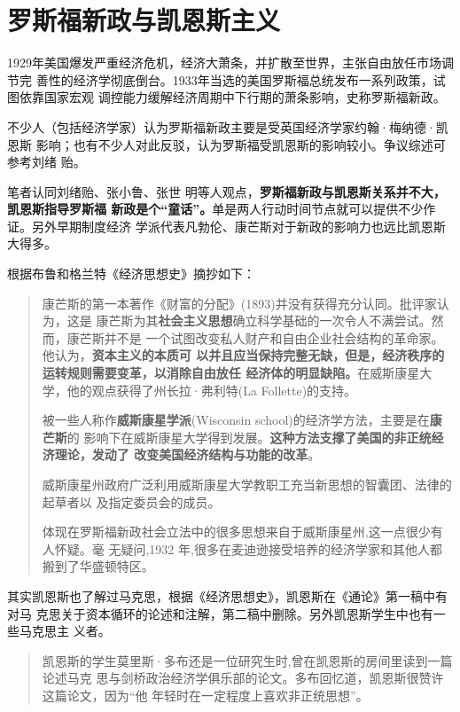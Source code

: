 \chapter{罗斯福新政与凯恩斯主义}


1929年美国爆发严重经济危机，经济大萧条，并扩散至世界，主张自由放任市场调节完
善性的经济学彻底倒台。1933年当选的美国罗斯福总统发布一系列政策，试图依靠国家宏观
调控能力缓解经济周期中下行期的萧条影响，史称罗斯福新政。

不少人（包括经济学家）认为罗斯福新政主要是受英国经济学家约翰·梅纳德·凯恩斯
影响；也有不少人对此反驳，认为罗斯福受凯恩斯的影响较小。争议综述可参考刘绪
贻。

笔者认同刘绪贻\cite{roosevelt}、张小鲁\cite{bijiao202002}、张世
明\cite{JJFX200100010}等人观点，\textbf{罗斯福新政与凯恩斯关系并不大，凯恩斯指导罗斯福
  新政是个“童话”。}单是两人行动时间节点就可以提供不少作证。另外早期制度经济
学派代表凡勃伦、康芒斯对于新政的影响力也远比凯恩斯大得多。

根据布鲁和格兰特《经济思想史》摘抄如下：
\begin{quotation}
  康芒斯的第一本著作《财富的分配》(1893)并没有获得充分认同。批评家认为，这是
  康芒斯为其\textbf{社会主义思想}确立科学基础的一次令人不满尝试。然而，康芒斯并不是
  一个试图改变私人财产和自由企业社会结构的革命家。他认为，\textbf{资本主义的本质可
    以并且应当保持完整无缺，但是，经济秩序的运转规则需要变革，以消除自由放任
    经济体的明显缺陷。}在威斯康星大学，他的观点获得了州长拉·弗利特(La
  Follette)的支持。

  被一些人称作\textbf{威斯康星学派}(Wisconsin school)的经济学方法，主要是在\textbf{康芒斯}的
  影响下在威斯康星大学得到发展。\textbf{这种方法支撑了美国的非正统经济理论，发动了
    改变美国经济结构与功能的改革}。

  威斯康星州政府广泛利用威斯康星大学教职工充当新思想的智囊团、法律的起草者以
  及指定委员会的成员。

  体现在罗斯福新政社会立法中的很多思想来自于威斯康星州,这一点很少有人怀疑。毫
  无疑问,1932 年,很多在麦迪逊接受培养的经济学家和其他人都搬到了华盛顿特区。
\end{quotation}

其实凯恩斯也了解过马克思，根据《经济思想史》，凯恩斯在《通论》第一稿中有对马
克思关于资本循环的论述和注解，第二稿中删除。另外凯恩斯学生中也有一些马克思主
义者。
\begin{quotation}
  凯恩斯的学生莫里斯·多布还是一位研究生时,曾在凯恩斯的房间里读到一篇论述马克
  思与剑桥政治经济学俱乐部的论文。多布回忆道，凯恩斯很赞许这篇论文，因为“他
  年轻时在一定程度上喜欢非正统思想”。
\end{quotation}

